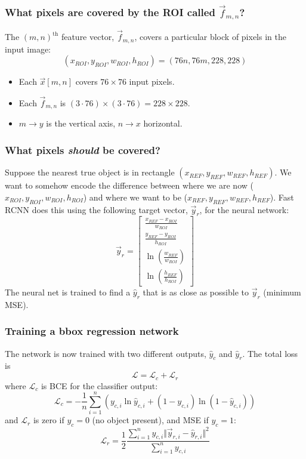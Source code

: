 \documentclass{beamer}
\begin{document}
\begin{frame}
  \frametitle{What pixels are covered by the ROI called
    $\vec{f}_{m,n}$?}

  The $(m,n)^{\textrm{th}}$ feature vector, $\vec{f}_{m,n}$, covers a
  particular block of pixels in the input image:
  \[
  (x_{ROI},y_{ROI},w_{ROI},h_{ROI}) =
  (76n, 76m, 228,228)
  \]
  \begin{itemize}
  \item Each $\vec{x}[m,n]$ covers $76\times 76$ input pixels.
  \item Each $\vec{f}_{m,n}$ is $(3\cdot 76)\times(3\cdot 76)=228\times 228$.
  \item $m\rightarrow y$ is the vertical axis, $n\rightarrow x$ horizontal.
  \end{itemize}
\end{frame}

\begin{frame}
  \frametitle{What pixels {\bf\em should} be covered?}

  Suppose the nearest true object is in rectangle
  $(x_{REF},y_{REF},w_{REF},h_{REF})$.  We want to somehow encode the
  difference between where we are now
  ($x_{ROI},y_{ROI},w_{ROI},h_{ROI}$) and where we want to be
  ($x_{REF},y_{REF},w_{REF},h_{REF}$).  Fast RCNN does this using the
  following target vector, $\vec{y}_r$, for the neural network:
  \[
  \vec{y}_r = \left[\begin{array}{c}
      \frac{x_{REF}-x_{ROI}}{w_{ROI}}\\
      \frac{y_{REF}-y_{ROI}}{h_{ROI}}\\
      \ln\left(\frac{w_{REF}}{w_{ROI}}\right)\\
      \ln\left(\frac{h_{REF}}{h_{ROI}}\right)
    \end{array}\right]
  \]
  The neural net is trained to find a $\hat{y}_r$ that is as close as
  possible to $\vec{y}_r$ (minimum MSE).
\end{frame}


\begin{frame}
  \frametitle{Training a bbox regression network}

  The network is now trained with two different outputs, $\hat{y}_c$
  and $\hat{y}_r$.  The total loss is
  \begin{displaymath}
    {\mathcal L}={\mathcal L}_c+{\mathcal L}_r
  \end{displaymath}
  where ${\mathcal L}_c$ is BCE for the classifier output:
  \begin{displaymath}
    {\mathcal L}_c = -\frac{1}{n}\sum_{i=1}^n \left(y_{c,i}\ln\hat{y}_{c,i}+(1-y_{c,i})\ln(1-\hat{y}_{c,i})
    \right)
  \end{displaymath}
  and ${\mathcal L}_r$ is zero if $y_c=0$ (no object present), and MSE
  if $y_c=1$:
  \begin{displaymath}
    {\mathcal L}_r = \frac{1}{2}
    \frac{\sum_{i=1}^n y_{c,i}\Vert\vec{y}_{r,i}-\hat{y}_{r,i}\Vert^2}{\sum_{i=1}^n y_{c,i}}
  \end{displaymath}
\end{frame}
    
\end{document}
